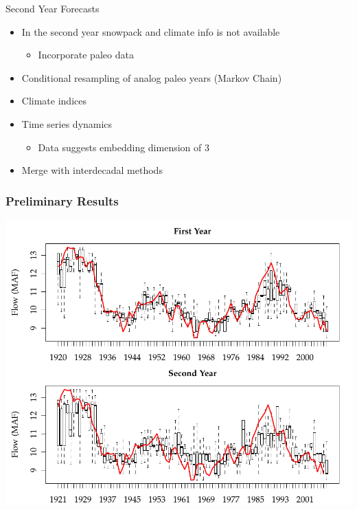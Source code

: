 \documentclass{beamer}
\begin{document}
\begin{frame}{Second Year Forecasts}

\begin{itemize}
\item In the second year snowpack and climate info is not available
\begin{itemize}
\item Incorporate paleo data
\end{itemize}
\item Conditional resampling of analog paleo years (Markov Chain)
\item Climate indices 
\item Time series dynamics
\begin{itemize}
\item Data suggests embedding dimension of 3
\end{itemize}
\item Merge with interdecadal methods
\end{itemize}

\end{frame}
\begin{frame}
\frametitle{Preliminary Results}
\includegraphics[width=.9\textwidth]{figs/fig-11yrm-q4.pdf}
\end{frame}


\section{~}
\end{document}
